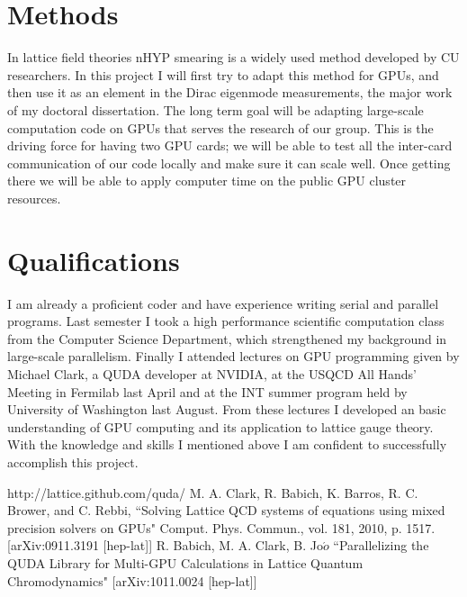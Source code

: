 \documentclass[11pt]{article}
\begin{document}
   \section*{Methods} %
  In lattice field theories nHYP smearing is a widely used method developed by CU researchers. 
  In this project I will first try to adapt this method for GPUs, and then use it as an element in the Dirac eigenmode measurements, the major work of my doctoral dissertation. The long term goal will be adapting large-scale computation code on GPUs that serves the research of our group. This is the driving force for having two GPU cards; we will be able to test all the inter-card communication of our code locally and make sure it can scale well. Once getting there we will be able to apply computer time on the public GPU cluster resources. 
    
  \section*{Qualifications} %
  I am already a proficient coder and have experience writing serial and parallel programs.
  Last semester I took a high performance scientific computation class from the Computer Science Department, which strengthened my background in large-scale parallelism.
  Finally I attended lectures on GPU programming given by Michael Clark, a QUDA developer at NVIDIA, at the USQCD All Hands' Meeting in Fermilab last April and at the INT summer program held by University of Washington last August. 
  From these lectures I developed an basic understanding of GPU computing and its application to lattice gauge theory. 
  With the knowledge and skills I mentioned above I am confident to successfully accomplish this project.

%
\begin{thebibliography}{99}
http://lattice.github.com/quda/
M. A. Clark, R. Babich, K. Barros, R. C. Brower, and C. Rebbi,
``Solving Lattice QCD systems of equations using mixed precision solvers on GPUs" Comput. Phys. Commun., vol. 181, 2010, p. 1517. [arXiv:0911.3191 
[hep-lat]]
R. Babich, M. A. Clark, B. Jo$\acute{o}$ ``Parallelizing the QUDA Library for Multi-GPU Calculations in Lattice Quantum Chromodynamics" [arXiv:1011.0024 
[hep-lat]]

\end{thebibliography}
\end{document}
